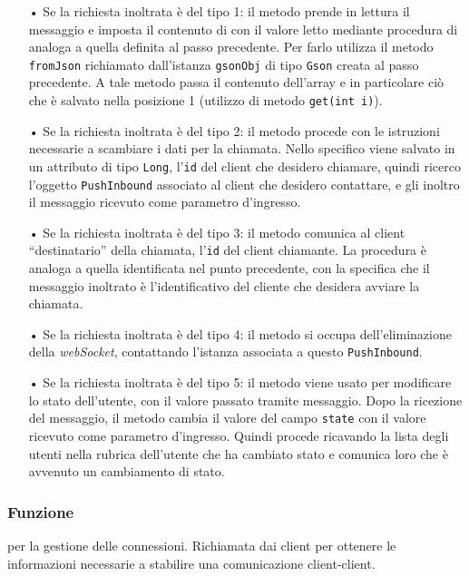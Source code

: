 \begin{description}
	\begin{itemize}
		\item[•]Se la richiesta inoltrata è del tipo 1: il metodo prende in lettura il messaggio e imposta il contenuto di  con il valore letto mediante procedura di  analoga a quella definita al passo precedente. Per farlo utilizza il metodo \texttt{fromJson} richiamato dall'istanza \texttt{gsonObj} di tipo \texttt{Gson} creata al passo precedente. A tale metodo passa il contenuto dell'array e in particolare ciò che è salvato nella posizione 1 (utilizzo di metodo \texttt{get(int i)}).
		\item[•]Se la richiesta inoltrata è del tipo 2: il metodo procede con le istruzioni necessarie a scambiare i dati per la chiamata. Nello specifico viene salvato in un attributo di tipo \texttt{Long}, l'\texttt{id} del client che desidero chiamare, quindi ricerco l'oggetto \texttt{PushInbound} associato al client che desidero contattare, e gli inoltro il messaggio ricevuto come parametro d'ingresso.
		\item[•]Se la richiesta inoltrata è del tipo 3: il metodo comunica al client ``destinatario'' della chiamata, l'\texttt{id} del client chiamante. La procedura è analoga a quella identificata nel punto precedente, con la specifica che il messaggio inoltrato è l'identificativo del cliente che desidera avviare la chiamata.
		\item[•]Se la richiesta inoltrata è del tipo 4: il metodo si occupa dell'eliminazione della \textit{webSocket}, contattando l'istanza  associata a questo \texttt{PushInbound}.
		\item[•]Se la richiesta inoltrata è del tipo 5: il metodo viene usato per modificare lo stato dell'utente, con il valore passato tramite messaggio. Dopo la ricezione del messaggio, il metodo cambia il valore del campo \texttt{state} con il valore ricevuto come parametro d'ingresso. Quindi procede ricavando la lista degli utenti nella rubrica dell'utente che ha cambiato stato e comunica loro che è avvenuto un cambiamento di stato.
	\end{itemize}
\end{description}


\subsubsection*{Funzione}
 per la gestione delle connessioni. Richiamata dai client per ottenere le informazioni necessarie a stabilire una comunicazione client-client.

